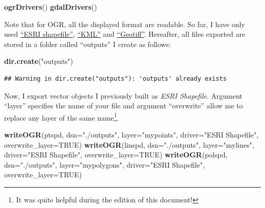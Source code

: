 \documentclass[]{report}
\newenvironment{Shaded}{\begin{snugshade}}{\end{snugshade}}
\newcommand{\KeywordTok}[1]{\textcolor[rgb]{0.13,0.29,0.53}{\textbf{{#1}}}}
\newcommand{\DataTypeTok}[1]{\textcolor[rgb]{0.13,0.29,0.53}{{#1}}}
\newcommand{\StringTok}[1]{\textcolor[rgb]{0.31,0.60,0.02}{{#1}}}
\newcommand{\OtherTok}[1]{\textcolor[rgb]{0.56,0.35,0.01}{{#1}}}
\newcommand{\NormalTok}[1]{{#1}}
\let\rmarkdownfootnote\footnote%
\def\footnote{\protect\rmarkdownfootnote}
\begin{document}
\begin{Shaded}
\begin{Highlighting}[]
\KeywordTok{ogrDrivers}\NormalTok{()}
\KeywordTok{gdalDrivers}\NormalTok{()}
\end{Highlighting}
\end{Shaded}

Note that for OGR, all the displayed format are readable. So far, I have
only used \href{https://en.wikipedia.org/wiki/Shapefile}{``ESRI
shapefile''},
\href{https://en.wikipedia.org/wiki/Keyhole_Markup_Language}{``KML''}
and \href{https://en.wikipedia.org/wiki/GeoTIFF}{``Geotiff''}.
Hereafter, all files exported are stored in a folder called ``outputs''
I create as follows:

\begin{Shaded}
\begin{Highlighting}[]
\KeywordTok{dir.create}\NormalTok{(}\StringTok{"outputs"}\NormalTok{)}
\end{Highlighting}
\end{Shaded}

\begin{verbatim}
## Warning in dir.create("outputs"): 'outputs' already exists
\end{verbatim}

Now, I export vector objects I previously built as \emph{ESRI
Shapefile}. Argument ``layer'' specifies the name of your file and
argument ``overwrite'' allow me to replace any layer of the same
name\footnote{It was quite helpful during the edition of this document!}.

\begin{Shaded}
\begin{Highlighting}[]
\KeywordTok{writeOGR}\NormalTok{(ptspd, }\DataTypeTok{dsn=}\StringTok{"./outputs"}\NormalTok{, }\DataTypeTok{layer=}\StringTok{"mypoints"}\NormalTok{,}
    \DataTypeTok{driver=}\StringTok{"ESRI Shapefile"}\NormalTok{, }\DataTypeTok{overwrite_layer=}\OtherTok{TRUE}\NormalTok{)}
\KeywordTok{writeOGR}\NormalTok{(linspd, }\DataTypeTok{dsn=}\StringTok{"./outputs"}\NormalTok{, }\DataTypeTok{layer=}\StringTok{"mylines"}\NormalTok{,}
    \DataTypeTok{driver=}\StringTok{"ESRI Shapefile"}\NormalTok{, }\DataTypeTok{overwrite_layer=}\OtherTok{TRUE}\NormalTok{)}
\KeywordTok{writeOGR}\NormalTok{(polspd, }\DataTypeTok{dsn=}\StringTok{"./outputs"}\NormalTok{, }\DataTypeTok{layer=}\StringTok{"mypolygons"}\NormalTok{,}
    \DataTypeTok{driver=}\StringTok{"ESRI Shapefile"}\NormalTok{, }\DataTypeTok{overwrite_layer=}\OtherTok{TRUE}\NormalTok{)}
\end{Highlighting}
\end{Shaded}
\end{document}
